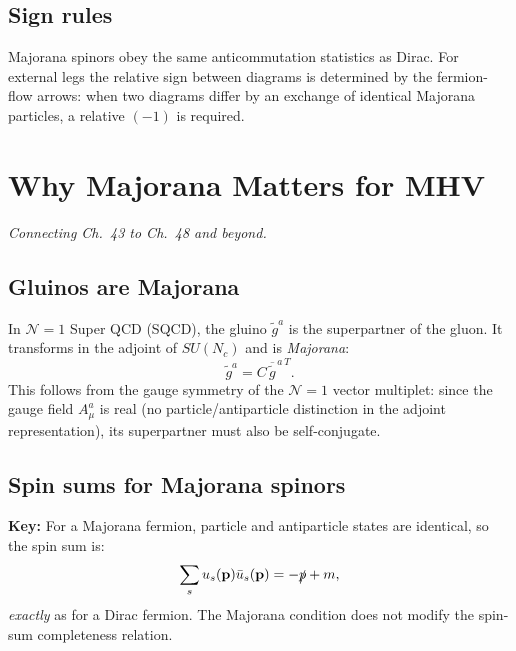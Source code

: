 \subsection{Sign rules}

Majorana spinors obey the same anticommutation statistics as Dirac.  For external
legs the relative sign between diagrams is determined by the fermion-flow arrows:
when two diagrams differ by an exchange of identical Majorana particles, a relative
$(-1)$ is required.

\section{Why Majorana Matters for MHV}

\textit{Connecting Ch.~43 to Ch.~48 and beyond.}

\subsection{Gluinos are Majorana}

In $\mathcal{N}=1$ Super QCD (SQCD), the gluino $\tilde g^a$ is the superpartner
of the gluon.  It transforms in the adjoint of $SU(N_c)$ and is \emph{Majorana}:
\begin{equation}
  \tilde g^a = C\,\overline{\tilde g}^{\,a\,T}.
\end{equation}
This follows from the gauge symmetry of the $\mathcal{N}=1$ vector multiplet:
since the gauge field $A_\mu^a$ is real (no particle/antiparticle distinction in
the adjoint representation), its superpartner must also be self-conjugate.

\subsection{Spin sums for Majorana spinors}

\begin{mdframed}[backgroundcolor=blue!5]
\textbf{Key:} For a Majorana fermion, particle and antiparticle states are
identical, so the spin sum is:
\begin{equation}\label{eq:majorana-spinsum}
  \sum_s u_s(\mathbf{p})\bar u_s(\mathbf{p}) = -\slashed{p} + m,
\end{equation}
\emph{exactly} as for a Dirac fermion.  The Majorana condition does not modify
the spin-sum completeness relation.
\end{mdframed}

